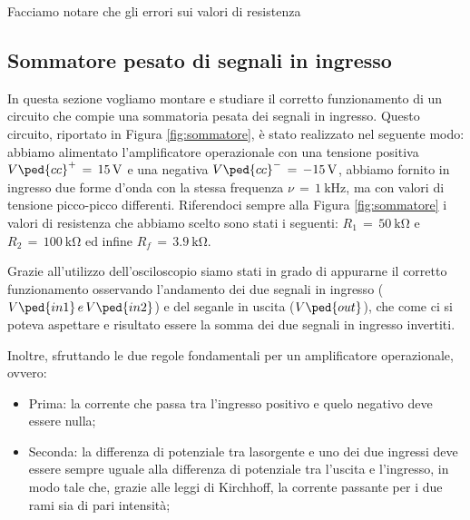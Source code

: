 Facciamo notare che gli errori sui valori di resistenza  

\subsection*{Sommatore pesato di segnali in ingresso}

In questa sezione vogliamo montare e studiare il corretto funzionamento di un circuito che compie una sommatoria pesata dei segnali in ingresso. Questo circuito, riportato in Figura \ref{fig:sommatore}, è stato realizzato nel seguente modo: abbiamo alimentato l'amplificatore operazionale con una tensione positiva $V\ped{cc}^+\,=\,\SI{+15}{\volt}$ e una negativa $V\ped{cc}^-\,=\,\SI{-15}{\volt}$, abbiamo fornito in ingresso due forme d'onda con la stessa frequenza $\nu\,=\,\SI{1}{\kilo\hertz}$, ma con valori di tensione picco-picco differenti. Riferendoci sempre alla Figura \ref{fig:sommatore} i valori di resistenza che abbiamo scelto sono stati i seguenti: $R_1\,=\,\SI{50}{\kilo\ohm}$ e $R_2\,=\,\SI{100}{\kilo\ohm}$ ed infine $R_f\,=\,\SI{3.9}{\kilo\ohm}$.

Grazie all'utilizzo dell'osciloscopio siamo stati in grado di appurarne il corretto funzionamento osservando l'andamento dei due segnali in ingresso ($V\ped{in1}\,e\,V\ped{in2} $) e del seganle in uscita ($V\ped{out}$), che come ci si poteva aspettare e risultato essere la somma dei due segnali in ingresso invertiti.

Inoltre, sfruttando le due regole fondamentali per un amplificatore operazionale, ovvero:
\begin{itemize}
	\item{Prima: la corrente che passa tra l'ingresso positivo e quelo negativo deve essere nulla;}
	\item{Seconda: la differenza di potenziale tra lasorgente e uno dei due ingressi deve essere sempre uguale alla differenza di potenziale tra l'uscita e l'ingresso, in modo tale che, grazie alle leggi di Kirchhoff, la corrente passante per i due rami sia di pari intensità;}
\end{itemize}










